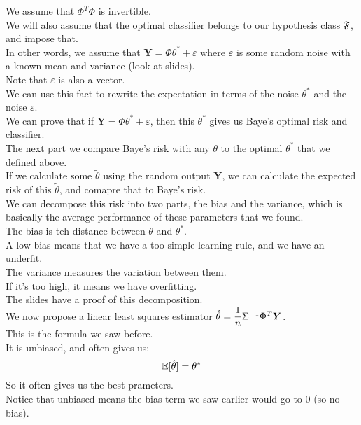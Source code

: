 \documentclass[12pt]{article}
\begin{document}
We assume that $\Phi^T\Phi$ is invertible. \\

We will also assume that the optimal classifier
belongs to our hypothesis class $\mathfrak{F}$,
and impose that. \\
In other words, we assume that
$\boldsymbol{Y} = \Phi \theta^* + \varepsilon$
where $\varepsilon$ is some random noise
with a known mean and variance (look at slides). \\

Note that $\varepsilon$ is also a vector. \\

We can use this fact to rewrite the expectation
in terms of the noise $\theta^*$ and the noise 
$\varepsilon$. \\

We can prove that if 
$\boldsymbol{Y} = \Phi \theta^* + \varepsilon$,
then this $\theta^*$ gives us Baye's optimal
risk and classifier. \\

The next part we compare Baye's risk with
any $\theta$ to the optimal $\theta^*$
that we defined above. \\
If we calculate some $\tilde{\theta}$
using the random output $\boldsymbol{Y}$,
we can calculate the expected risk
of this $\tilde{\theta}$,
and comapre that to Baye's risk. \\
We can decompose this risk into two parts,
the bias and the variance,
which is basically the average performance
of these parameters that we found. \\

The bias is teh distance between $\tilde{\theta}$
and $\theta^*$. \\
A low bias means that we have a too simple
learning rule, and we have an underfit.\\

The variance measures the variation between them. \\
If it's too high, it means we have overfitting. \\

The slides have a proof of this decomposition. \\

We now propose a linear least squares
estimator 
$\hat{\theta} = \dfrac{1}{n}\Sigma^{-1} \Phi^T 
\boldsymbol{Y}$. \\
This is the formula we saw before. \\
It is unbiased, and often gives us:
\[ \mathbb{E}[\hat{\theta}] = \theta^* \]
So it often gives us the best prameters. \\
Notice that unbiased means the bias
term we saw earlier would go to $0$
(so no bias). \\
\end{document}
